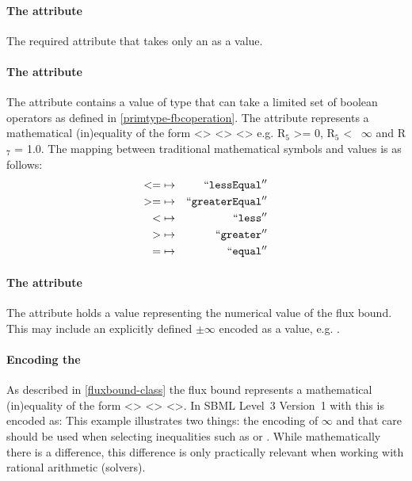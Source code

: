 \paragraph{The  attribute}
The required  attribute that takes only an \SBML \Reaction
{} as a value.

\paragraph{The  attribute}
The  attribute contains a value of type
 that can take a limited set of boolean operators as
defined in \ref{primtype-fbcoperation}. The  attribute
represents a mathematical (in)equality of the form <>
<> <> e.g. R$_{5}$
>= 0, R$_{5}$ <~ $\infty$ and R$_{7}$ = 1.0. The mapping between traditional
mathematical symbols and  values is as follows:
\begin{eqnarray*}
\label{fb-operation-enum}
 \nonumber
  <= & \mapsto & ``\textcolor{black}{\textup{\ttfamily{lessEqual}}}''\\
  >= & \mapsto & ``\textcolor{black}{\textup{\ttfamily{greaterEqual}}}''\\
  < & \mapsto & ``\textcolor{black}{\textup{\ttfamily{less}}}''\\
  > & \mapsto & ``\textcolor{black}{\textup{\ttfamily{greater}}}''\\
  = & \mapsto & ``\textcolor{black}{\textup{\ttfamily{equal}}}''
\end{eqnarray*}

\paragraph{The  attribute}
The  attribute holds a  value representing the
numerical value of the flux bound. This may include an explicitly defined
$\pm\infty$ encoded as a value, e.g. .

\paragraph{Encoding the \FluxBound}
As described in \ref{fluxbound-class} the flux bound represents a
mathematical (in)equality of the form <> <>
<>. In SBML Level~3 Version~1 with \FBC this is encoded as:
%
%
This example illustrates two things: the encoding of $\infty$ and that care
should be used when selecting inequalities such as  or
. While mathematically there is a difference, this difference
is only practically relevant when working with rational arithmetic
(solvers).

